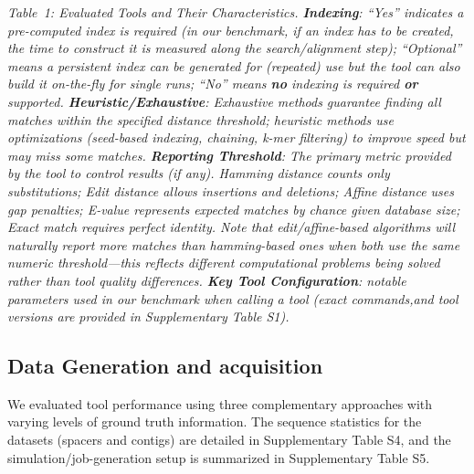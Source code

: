 \documentclass[
]{article}
\begin{document}
\emph{Table~1: Evaluated Tools and Their Characteristics.
\textbf{Indexing}: ``Yes'' indicates a pre-computed index is required
(in our benchmark, if an index has to be created, the time to construct
it is measured along the search/alignment step); ``Optional'' means a
persistent index can be generated for (repeated) use but the tool can
also build it on-the-fly for single runs; ``No'' means \textbf{no}
indexing is required \textbf{or} supported.
\textbf{Heuristic/Exhaustive}: Exhaustive methods guarantee finding all
matches within the specified distance threshold; heuristic methods use
optimizations (seed-based indexing, chaining, k-mer filtering) to
improve speed but may miss some matches. \textbf{Reporting Threshold}:
The primary metric provided by the tool to control results (if any).
Hamming distance counts only substitutions; Edit distance allows
insertions and deletions; Affine distance uses gap penalties; E-value
represents expected matches by chance given database size; Exact match
requires perfect identity. Note that edit/affine-based algorithms will
naturally report more matches than hamming-based ones when both use the
same numeric threshold---this reflects different computational problems
being solved rather than tool quality differences. \textbf{Key Tool
Configuration}: notable parameters used in our benchmark when calling a
tool (exact commands,and tool versions are provided in Supplementary
Table S1).}

\subsection{Data Generation and acquisition}\label{sec-data}

We evaluated tool performance using three complementary approaches with
varying levels of ground truth information. The sequence statistics for
the datasets (spacers and contigs) are detailed in Supplementary Table
S4, and the simulation/job-generation setup is summarized in
Supplementary Table S5.
\end{document}
